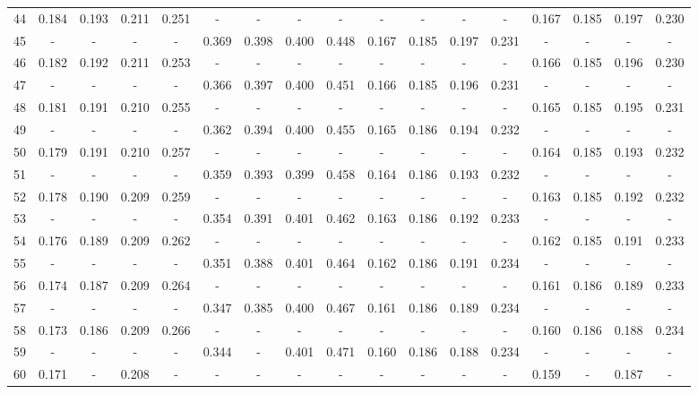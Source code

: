 \documentclass{report}
\begin{document}
\begin{appendices}
\begin{table}
\begin{tabular}{|c|cccc|cccc|cccc|cccc|}
44 & 0.184 & 0.193 & 0.211 & 0.251 &   -   &   -   &   -   &   -   &   -   &   -   &   -   &   -   & 0.167 & 0.185 & 0.197 & 0.230\\
45 &   -   &   -   &   -   &   -   & 0.369 & 0.398 & 0.400 & 0.448 & 0.167 & 0.185 & 0.197 & 0.231 &   -   &   -   &   -   &   -  \\
46 & 0.182 & 0.192 & 0.211 & 0.253 &   -   &   -   &   -   &   -   &   -   &   -   &   -   &   -   & 0.166 & 0.185 & 0.196 & 0.230\\
47 &   -   &   -   &   -   &   -   & 0.366 & 0.397 & 0.400 & 0.451 & 0.166 & 0.185 & 0.196 & 0.231 &   -   &   -   &   -   &   -  \\
48 & 0.181 & 0.191 & 0.210 & 0.255 &   -   &   -   &   -   &   -   &   -   &   -   &   -   &   -   & 0.165 & 0.185 & 0.195 & 0.231\\
49 &   -   &   -   &   -   &   -   & 0.362 & 0.394 & 0.400 & 0.455 & 0.165 & 0.186 & 0.194 & 0.232 &   -   &   -   &   -   &   -  \\
50 & 0.179 & 0.191 & 0.210 & 0.257 &   -   &   -   &   -   &   -   &   -   &   -   &   -   &   -   & 0.164 & 0.185 & 0.193 & 0.232\\
51 &   -   &   -   &   -   &   -   & 0.359 & 0.393 & 0.399 & 0.458 & 0.164 & 0.186 & 0.193 & 0.232 &   -   &   -   &   -   &   -  \\
52 & 0.178 & 0.190 & 0.209 & 0.259 &   -   &   -   &   -   &   -   &   -   &   -   &   -   &   -   & 0.163 & 0.185 & 0.192 & 0.232\\
53 &   -   &   -   &   -   &   -   & 0.354 & 0.391 & 0.401 & 0.462 & 0.163 & 0.186 & 0.192 & 0.233 &   -   &   -   &   -   &   -  \\
54 & 0.176 & 0.189 & 0.209 & 0.262 &   -   &   -   &   -   &   -   &   -   &   -   &   -   &   -   & 0.162 & 0.185 & 0.191 & 0.233\\
55 &   -   &   -   &   -   &   -   & 0.351 & 0.388 & 0.401 & 0.464 & 0.162 & 0.186 & 0.191 & 0.234 &   -   &   -   &   -   &   -  \\
56 & 0.174 & 0.187 & 0.209 & 0.264 &   -   &   -   &   -   &   -   &   -   &   -   &   -   &   -   & 0.161 & 0.186 & 0.189 & 0.233\\
57 &   -   &   -   &   -   &   -   & 0.347 & 0.385 & 0.400 & 0.467 & 0.161 & 0.186 & 0.189 & 0.234 &   -   &   -   &   -   &   -  \\
58 & 0.173 & 0.186 & 0.209 & 0.266 &   -   &   -   &   -   &   -   &   -   &   -   &   -   &   -   & 0.160 & 0.186 & 0.188 & 0.234\\
59 &   -   &   -   &   -   &   -   & 0.344 &   -   & 0.401 & 0.471 & 0.160 & 0.186 & 0.188 & 0.234 &   -   &   -   &   -   &   -  \\
60 & 0.171 &   -   & 0.208 &   -   &   -   &   -   &   -   &   -   &   -   &   -   &   -   &   -   & 0.159 &   -   & 0.187 &   -  \\
\hline
\end{tabular}
\end{table}


\end{appendices}
\end{document}
